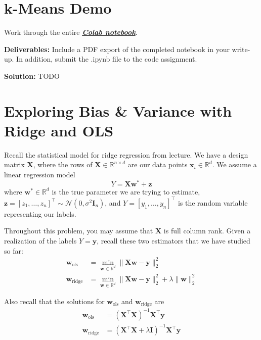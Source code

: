 \documentclass{article}
\newcommand{\Question}[1]{\Large \section{ #1 } \normalsize}
\newcommand{\mat}[1]{\mathbf{#1}}
\renewcommand{\vec}[1]{\boldsymbol{\mathbf{#1}}}
\newenvironment{solution}{\color{blue} \smallskip \textbf{Solution:}}{}
\begin{document}
\fontsize{12}{15}\selectfont

\Question{k-Means Demo}

Work through the entire
\href{https://drive.google.com/file/d/1RvCBdIIZUk-Z9E3dRXBHsixfSNhdPfWC/view?usp=drive_link}{\textbf{\emph{Colab notebook}}}.

\textbf{Deliverables:} Include a PDF export of the completed notebook in your write-up. In addition, submit the .ipynb file to the code assignment.

\begin{solution}
    TODO
\end{solution}


\newpage
\Question{Exploring Bias \& Variance with Ridge and OLS}

Recall the statistical model for ridge regression from lecture. We have a design matrix $\mat{X}$, where the rows of $\mat{X}\in\mathbb{R}^{n\times d}$ are our data points $\vec{x}_i\in\mathbb{R}^d$. We assume a linear regression model
\[Y = \mat{X}\vec{w}^* + \vec{z}\]
where $\vec{w}^*\in\mathbb{R}^d$ is the true parameter we are trying to estimate, $\vec{z}=[z_1, \ldots, z_n]^\top \sim\mathcal{N}(0,\sigma^2\mat{I}_n)$, and $Y = [y_1, \ldots, y_n]^\top$ is the random variable representing our labels.

Throughout this problem, you may assume that $\mat{X}$ is full column rank. Given a realization of the labels $Y=\vec{y}$, recall these two estimators that we have studied so far:
\begin{align*}
    \vec{w}_{\text{ols}} &= \min_{\vec{w} \in \mathbb{R}^d} \|\mat{X}\vec{w} - \vec{y}\|_2^2\\
    \vec{w}_{\text{ridge}} &= \min_{\vec{w} \in \mathbb{R}^d} \|\mat{X}\vec{w} - \vec{y}\|_2^2 + \lambda \|\vec{w}\|_2^2
\end{align*}

Also recall that the solutions for $\vec{w}_{\text{ols}}$ and $\vec{w}_{\text{ridge}}$ are
\begin{align*}
    \vec{w}_{\text{ols}} &= (\mat{X}^\top\mat{X})^{-1}\mat{X}^\top\vec{y} \\
    \vec{w}_{\text{ridge}} &= (\mat{X}^\top\mat{X} + \lambda \mat{I})^{-1}\mat{X}^\top\vec{y}
\end{align*}
\end{document}
